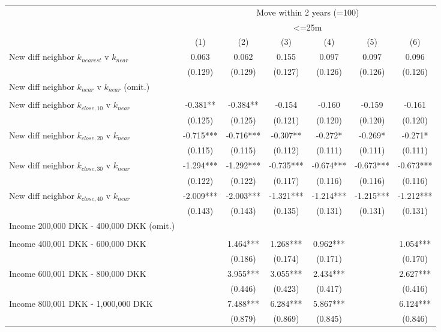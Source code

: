 \begin{tabular}{lcccccc}
\toprule
 & \multicolumn{6}{c}{Move within 2 years (=100)} \\ 
\cmidrule(lr){2-7}
 & \multicolumn{6}{c}{<=25m} \\ 
\cmidrule(lr){2-7}
  & (1) & (2) & (3) & (4) & (5) & (6) \\ 
\midrule
New diff neighbor $k_{nearest}$ v $k_{near}$ & 0.063 & 0.062 & 0.155 & 0.097 & 0.097 & 0.096 \\ 
 & (0.129) & (0.129) & (0.127) & (0.126) & (0.126) & (0.126) \\ 
New diff neighbor $k_{near}$ v $k_{near}$ (omit.) & & & & & & \\ 
 &   &   &   &   &   &   \\ 
New diff neighbor $k_{close,10}$ v $k_{near}$ & -0.381** & -0.384** & -0.154 & -0.160 & -0.159 & -0.161 \\ 
 & (0.125) & (0.125) & (0.121) & (0.120) & (0.120) & (0.120) \\ 
New diff neighbor $k_{close,20}$ v $k_{near}$ & -0.715*** & -0.716*** & -0.307** & -0.272* & -0.269* & -0.271* \\ 
 & (0.115) & (0.115) & (0.112) & (0.111) & (0.111) & (0.111) \\ 
New diff neighbor $k_{close,30}$ v $k_{near}$ & -1.294*** & -1.292*** & -0.735*** & -0.674*** & -0.673*** & -0.673*** \\ 
 & (0.122) & (0.122) & (0.117) & (0.116) & (0.116) & (0.116) \\ 
New diff neighbor $k_{close,40}$ v $k_{near}$ & -2.009*** & -2.003*** & -1.321*** & -1.214*** & -1.215*** & -1.212*** \\ 
 & (0.143) & (0.143) & (0.135) & (0.131) & (0.131) & (0.131) \\ 
 Income 200,000 DKK - 400,000 DKK (omit.) &  &  &  &  &  &  \\ 
 &  &  &  &  &  &  \\ 
 Income 400,001 DKK - 600,000 DKK &  & 1.464*** & 1.268*** & 0.962*** &  & 1.054*** \\ 
 &  & (0.186) & (0.174) & (0.171) &  & (0.170) \\ 
Income 600,001 DKK - 800,000 DKK &  & 3.955*** & 3.055*** & 2.434*** &  & 2.627*** \\ 
 &  & (0.446) & (0.423) & (0.417) &  & (0.416) \\ 
Income 800,001 DKK - 1,000,000 DKK &  & 7.488*** & 6.284*** & 5.867*** &  & 6.124*** \\ 
 &  & (0.879) & (0.869) & (0.845) &  & (0.846) \\ 

\end{tabular}
